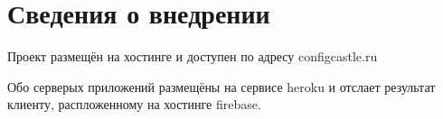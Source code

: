 \section{Сведения о внедрении}

Проект размещён на хостинге и доступен по адресу configcastle.ru

Обо серверых приложений размещёны на сервисе heroku и отслает результат клиенту, распложенному на хостинге firebase.
